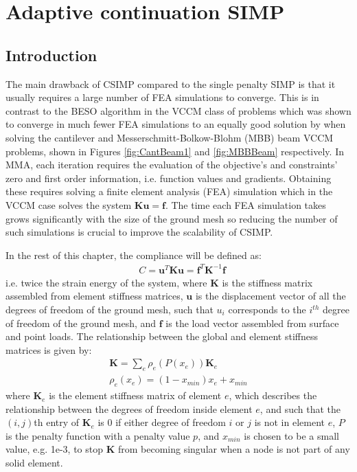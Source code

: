 \chapter{Adaptive continuation SIMP}\thispagestyle{EmptyHeader}
\label{chp:2}

\section{Introduction}

The main drawback of CSIMP compared to the single penalty SIMP is that it usually requires a large number of FEA simulations to converge. This is in contrast to the BESO algorithm in the VCCM class of problems which was shown to converge in much fewer FEA simulations to an equally good solution by \cite{Huang2010a} when solving the cantilever and Messerschmitt-Bolkow-Blohm (MBB) beam VCCM problems, shown in Figures \ref{fig:CantBeam1} and \ref{fig:MBBBeam} respectively. In MMA, each iteration requires the evaluation of the objective's and constraints' zero and first order information, i.e. function values and gradients. Obtaining these requires solving a finite element analysis (FEA) simulation which in the VCCM case solves the system $\bm{K}\bm{u}=\bm{f}$. The time each FEA simulation takes grows significantly with the size of the ground mesh so reducing the number of such simulations is crucial to improve the scalability of CSIMP.




In the rest of this chapter, the compliance will be defined as:
  \begin{align} \label{eqn:compliance}
    & C = \bm{u}^T\bm{K}\bm{u} = \bm{f}^T\bm{K}^{-1}\bm{f} 
  \end{align}
i.e. twice the strain energy of the system, where $\bm{K}$ is the stiffness matrix assembled from element stiffness matrices, $\bm{u}$ is the displacement vector of all the degrees of freedom of the ground mesh, such that $u_i$ corresponds to the $i^{th}$ degree of freedom of the ground mesh, and $\bm{f}$ is the load vector assembled from surface and point loads. The relationship between the global and element stiffness matrices is given by:
  \begin{gather} \label{eqn:assembly}
    \bm{K} = \sum\limits_e \rho_e(P(x_e)) \bm{K}_e \\
    \rho_e(x_e) = (1-x_{min})x_e + x_{min}
  \end{gather}
where $\bm{K}_e$ is the element stiffness matrix of element $e$, which describes the relationship between the degrees of freedom inside element $e$, and such that the $(i,j)$th entry of $\bm{K}_e$ is 0 if either degree of freedom $i$ or $j$ is not in element $e$, $P$ is the penalty function with a penalty value $p$, and $x_{min}$ is chosen to be a small value, e.g. 1e-3, to stop $\bm{K}$ from becoming singular when a node is not part of any solid element.

